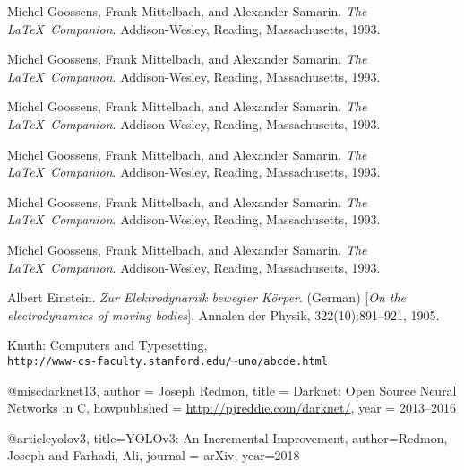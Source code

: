 \documentclass[11ot]{article}
\begin{document}
\begin{thebibliography}{9}
Michel Goossens, Frank Mittelbach, and Alexander Samarin. 
\textit{The \LaTeX\ Companion}. 
Addison-Wesley, Reading, Massachusetts, 1993.

Michel Goossens, Frank Mittelbach, and Alexander Samarin. 
\textit{The \LaTeX\ Companion}. 
Addison-Wesley, Reading, Massachusetts, 1993.

Michel Goossens, Frank Mittelbach, and Alexander Samarin. 
\textit{The \LaTeX\ Companion}. 
Addison-Wesley, Reading, Massachusetts, 1993.

Michel Goossens, Frank Mittelbach, and Alexander Samarin. 
\textit{The \LaTeX\ Companion}. 
Addison-Wesley, Reading, Massachusetts, 1993.

Michel Goossens, Frank Mittelbach, and Alexander Samarin. 
\textit{The \LaTeX\ Companion}. 
Addison-Wesley, Reading, Massachusetts, 1993.

Michel Goossens, Frank Mittelbach, and Alexander Samarin. 
\textit{The \LaTeX\ Companion}. 
Addison-Wesley, Reading, Massachusetts, 1993.

Albert Einstein. 
\textit{Zur Elektrodynamik bewegter K{\"o}rper}. (German) 
[\textit{On the electrodynamics of moving bodies}]. 
Annalen der Physik, 322(10):891–921, 1905.

Knuth: Computers and Typesetting,
\\\texttt{http://www-cs-faculty.stanford.edu/\~{}uno/abcde.html}
\end{thebibliography}

@misc{darknet13,
  author =   {Joseph Redmon},
  title =    {Darknet: Open Source Neural Networks in C},
  howpublished = {\url{http://pjreddie.com/darknet/}},
  year = {2013--2016}
}

@article{yolov3,
  title={YOLOv3: An Incremental Improvement},
  author={Redmon, Joseph and Farhadi, Ali},
  journal = {arXiv},
  year={2018}
}
\end{document}
